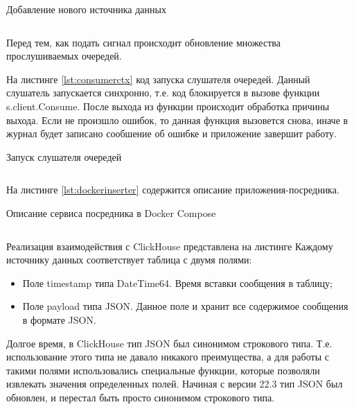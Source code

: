 \documentclass[14pt, russian]{scrartcl}
\begin{document}
\begin{listing}[H]
	\caption{Добавление нового источника данных}
	\label{lst:ctxclosing}
	\inputminted[style=bw, frame=single,fontsize = \footnotesize, linenos=false, xleftmargin = 1.5em]{shell}{./listings/contextclose.go}
\end{listing}

Перед тем, как подать сигнал происходит обновление множества
прослушиваемых очередей.

На листинге \ref{lst:consumerctx} код запуска слушателя очередей.
Данный слушатель запускается синхронно, т.е. код блокируется в 
вызове функции s.client.Consume. После выхода 
из функции происходит обработка причины выхода. Если 
не произшло ошибок, то данная функция вызовется снова, иначе
в журнал будет записано сообшение об ошибке и приложение завершит работу.

\begin{listing}[H]
	\caption{Запуск слушателя очередей}
	\label{lst:consumerctx}
	\inputminted[style=bw, frame=single,fontsize = \footnotesize, linenos=false, xleftmargin = 1.5em]{shell}{./listings/consumerctx.go}
\end{listing}

На листинге \ref{lst:dockerinserter} содержится описание приложения-посредника.

\begin{listing}[H]
	\caption{Описание сервиса посредника в Docker Compose}
	\label{lst:dockerinserter}
	\inputminted[style=bw, frame=single,fontsize = \footnotesize, linenos=false, xleftmargin = 1.5em]{yaml}{./listings/inserter.yml}
\end{listing}

Реализация взаимодействия с ClickHouse представлена на листинге 
Каждому источнику данных соответствует таблица с двумя полями:

\begin{itemize}
  \item Поле timestamp типа DateTime64. Время вставки сообщения в таблицу;
  \item Поле payload типа JSON. Данное поле и хранит все содержимое сообщения в формате JSON.
\end{itemize}

Долгое время, в ClickHouse тип JSON был синонимом строкового типа. Т.е. использование этого типа 
не давало никакого преимущества, а для работы с такими полями использовались специальные функции, которые 
позволяли извлекать значения определенных полей.
Начиная с версии 22.3 тип JSON был обновлен, и перестал быть просто синонимом строкового типа.
\end{document}
